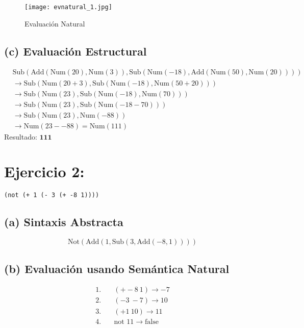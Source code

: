 \documentclass[12pt,letterpaper]{article}
\begin{document}
        \begin{figure}
            \centering
            \texttt{[image: evnatural\_1.jpg]}
            \caption{Evaluación Natural}
            \label{fig:enter-label}
        \end{figure}
    \newpage
    \subsection*{(c) Evaluación Estructural}


\begin{align*}
&\text{Sub}\left(\text{Add}\left(\text{Num}(20), \text{Num}(3)\right), \text{Sub}\left(\text{Num}(-18), \text{Add}\left(\text{Num}(50), \text{Num}(20)\right)\right)\right) \\
&\rightarrow \text{Sub}\left(\text{Num}(20 + 3), \text{Sub}\left(\text{Num}(-18), \text{Num}(50 + 20)\right)\right) \\
&\rightarrow \text{Sub}\left(\text{Num}(23), \text{Sub}\left(\text{Num}(-18), \text{Num}(70)\right)\right) \\
&\rightarrow \text{Sub}\left(\text{Num}(23), \text{Sub}\left(\text{Num}(-18 - 70)\right)\right) \\
&\rightarrow \text{Sub}\left(\text{Num}(23), \text{Num}(-88)\right) \\
&\rightarrow \text{Num}(23 - -88) = \text{Num}(111)
\end{align*}
Resultado: \(\mathbf{111}\)





\section*{Ejercicio 2:} 
\texttt{\large(not (+ 1 (- 3 (+ -8 1))))}

\subsection*{(a) Sintaxis Abstracta}
\[
\text{Not}(\text{Add}(1, \text{Sub}(3, \text{Add}(-8, 1))))
\]

\subsection*{(b) Evaluación usando Semántica Natural}

\begin{align*}
1. &\quad (+ -8\ 1) \rightarrow -7 \\
2. &\quad (- 3\ -7) \rightarrow 10 \\
3. &\quad (+ 1\ 10) \rightarrow 11 \\
4. &\quad \text{not } 11 \rightarrow \text{false}
\end{align*}
\end{document}
